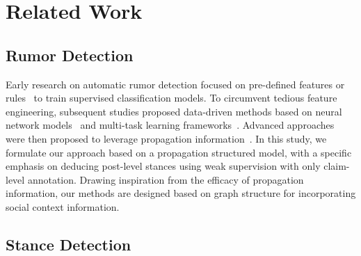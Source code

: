 \section{Related Work}
\vspace{-0.1cm}
\vspace{-0.1cm}
\subsection{Rumor Detection} 

Early research on automatic rumor detection focused on pre-defined features or rules~\cite{middleton2016geoparsing} to train supervised classification models. To circumvent tedious feature engineering, subsequent studies proposed data-driven methods based on neural network models~\cite{lin2021rumor, sun2022ddgcn, lin2022detect} and multi-task learning frameworks~\cite{ma2018detect,wei2019modeling,luo2024joint}. Advanced approaches were then proposed to leverage propagation information~\cite{lu2020gcan, bian2020rumor,yu2020coupled,ma2021improving, lin2023zero}. 
In this study, we formulate our approach based on a propagation structured model, with a specific emphasis on deducing post-level stances using weak supervision with only claim-level annotation. Drawing inspiration from the efficacy of propagation information, our methods are designed based on graph structure for incorporating social context information.

\subsection{Stance Detection} 

